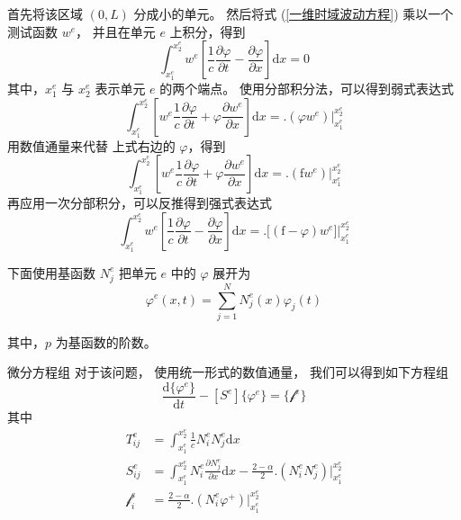 \begin{solution}
    首先将该区域 $(0,L)$ 分成小的单元。
    然后将式 (\ref{一维时域波动方程}) 乘以一个测试函数 $w^e$，
    并且在单元 $e$ 上积分，得到
    \begin{equation*}
        \int_{x_1^e}^{x_2^e}w^e\left[
            \frac{1}{c}\frac{\partial \varphi}{\partial t}
            -\frac{\partial \varphi}{\partial x}
        \right]\text{d}x=0
    \end{equation*}
    其中，$x_1^e$ 与 $x_2^e$ 表示单元 $e$ 的两个端点。
    使用分部积分法，可以得到弱式表达式
    \begin{equation*}
        \int_{x_1^e}^{x_2^e}\left[
            w^e\frac{1}{c}\frac{\partial \varphi}{\partial t}
            +\varphi\frac{\partial w^e}{\partial x}
        \right]\text{d}x
        =\Big.(\varphi w^e)\Big|_{x_1^e}^{x_2^e}
        \label{一维时域波动方程弱式}
    \end{equation*}
    用数值通量来代替
    上式右边的 $\varphi$，得到
    \begin{equation*}
        \int_{x_1^e}^{x_2^e}\left[
            w^e\frac{1}{c}\frac{\partial \varphi}{\partial t}
            +\varphi\frac{\partial w^e}{\partial x}
        \right]\text{d}x
        =\Big.(\text{f} w^e)\Big|_{x_1^e}^{x_2^e}
    \end{equation*}
    再应用一次分部积分，可以反推得到强式表达式
    \begin{equation*}
        \int_{x_1^e}^{x_2^e}w^e\left[
            \frac{1}{c}\frac{\partial \varphi}{\partial t}
            -\frac{\partial \varphi}{\partial x}
        \right]\text{d}x
        =\Big.\big[(\text{f}-\varphi) w^e\big]\Big|_{x_1^e}^{x_2^e}
    \end{equation*}
\end{solution}

\par 下面使用基函数 $N_j^e$ 把单元 $e$ 中的 $\varphi$ 展开为
\begin{equation}
    \varphi^e(x,t)=\sum_{j=1}^{N}N_j^e(x)\varphi_j(t)
\end{equation}
\par 其中，$p$ 为基函数的阶数。

\begin{theorem}{微分方程组}
    对于该问题，
    使用统一形式的数值通量，
    我们可以得到如下方程组
    \begin{equation}
        [T^e]\frac{\text{d}\{\varphi^e\}}{\text{d}t}
        -[S^e]\{\varphi^e\}
        =\{\mathscr{f}^e\}
    \end{equation}
    其中
    \begin{align}
        T_{ij}^e&=
        \int_{x_1^e}^{x_2^e}
        \frac{1}{c}N_i^eN_j^e\text{d}x\\
        S_{ij}^e&=
        \int_{x_1^e}^{x_2^e}
        N_i^e\frac{\partial N_j^e}{\partial x}
        \text{d}x-\frac{2-\alpha}{2}
        \Big.(N_i^e N_j^e)\Big|_{x_1^e}^{x_2^e}\\
        \mathscr{f}_i^e&=
        \frac{2-\alpha}{2}\Big.(N_i^e\varphi^+)\Big|_{x_1^e}^{x_2^e}
    \end{align}
\end{theorem}


